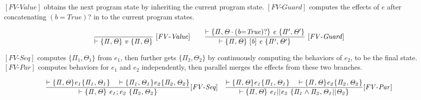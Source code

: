 \documentclass[acmsmall,10pt,review]{acmart}
\newcommand{\env}{\code{\mathcal{V}}}
\newcommand{\code}[1]{{\tt{\ensuremath{\m{#1}}}}}
\newcommand{\m}{\mathit}
\def\defeq{\ensuremath{\,\triangleq}}
\begin{document}
{\begin{comment}
To define the model, we introduce a stack \env\ and describe 
a program state in a four-elements tuple \s{H, G}, with the following concrete domains:
\begin{flalign*}
G {\defeq} \pi, \qquad\qquad
H  {\defeq} \Theta, \qquad\qquad
\env {\defeq} \code{var {\rightarrow} val }
\end{flalign*}

Let \code{\Pi} represents the pure constraints for all the terms; \code{H} represents the trace of \emph{history}; \code{C} represents the \emph{current} event or a waiting signal; 
\code{T} is a term binding \code{C}; 
\env\ be the environment containing all the local and output signals; 



\end{comment}

\vspace{1mm}
$[FV\text{-}\m{Value}]$  obtains the next program state by 
inheriting the current program state.
$[FV\text{-}Guard]$ computes the effects of \code{e} after concatenating
\code{(b{=}True)}? in to the current program states.  

{{\small\begin{gather*}
  \code{\frac{
  }
{  \vdash \{  \Pi, \Theta \}\  v \ 
\{ \Pi, \Theta \}} \  
 {[FV\text{-}Value]}} 
 \qquad
 \code{\frac{
  \vdash \{  \Pi, \Theta \cdot (b{=}True)? \}\  e \ 
  \{ \Pi^\prime, \Theta^\prime \}
  }
{  \vdash \{  \Pi, \Theta \}\  [b]\ e \ 
\{  \Pi^\prime, \Theta^\prime \}} \  
 {[FV\text{-}Guard]}} 
\end{gather*}}}

\vspace{1mm}
$[FV\text{-}Seq]$ computes  \code{ \{  \Pi_1, \Theta_1\} } 
from \code{e_1}, 
then further gets  \code{ \{  \Pi_2, \Theta_2 \} } by 
continuously computing the behaviors of \code{e_2}, to be the final state.
$[FV\text{-}Par]$ computes behaviors for  \code{e_1} and \code{e_2} independently,
then parallel merges the effects from these two branches.  

{{\small\begin{gather*}
  \code{\frac{ 
 \vdash \{ \Pi, \Theta\}  e_1  \{  \Pi_1, \Theta_1\} 
\ \  \ 
\vdash \{ \Pi_1, \Theta_1\}  e_2   \{  \Pi_2, \Theta_2 \} 
}{
  \vdash \{  \Pi, \Theta \}\  
  e_1;e_2 \ \{ \Pi_2, \Theta_2
  \}} 
   {[FV\text{-}Seq]}}  
\quad 
  \code{\frac{
 \vdash \{ \Pi, \Theta \}  e_1   \{  \Pi_1, \Theta_1\} 
\ \  \ 
\vdash \{  \Pi, \Theta \}  e_2   \{  \Pi_2, \Theta_2 \} 
    }{
\vdash \{   \Pi, \Theta \}\  e_1 || e_2 \ \{ 
\Pi_1  \wedge \Pi_2 , \Theta_1 || \Theta_2
\}}  
{[FV\text{-}Par]}} 
\end{gather*}}}



}
\end{document}
